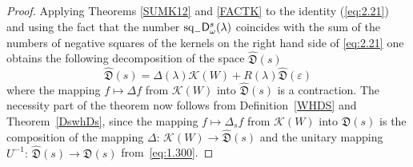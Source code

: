 \documentclass[12pt,twoside,a4paper]{amsart}
\theoremstyle{definition}
\numberwithin{equation}{section}
\begin{document}
\begin{proof}
Applying Theorems \ref{SUMK12} and \ref{FACTK} to the identity
(\ref{eq:2.21}) and using the fact that the number
$\textup{sq}_-{\mathsf D}^s_\omega(\lambda)$ coincides with the sum
of the numbers of negative squares of the kernels on the right hand
side of \eqref{eq:2.21} one obtains the following decomposition of
the space ${{{\widehat {{\mathfrak D}}} }}(s)$
\begin{equation}\label{eq:2.27}
   {{{\widehat {{\mathfrak D}}} }}(s)=\Delta({\lambda}){{\mathcal K}}(W)+R({\lambda}){{{\widehat {{\mathfrak D}}} }}(\varepsilon)
\end{equation}
where the mapping $f\mapsto \Delta  f$ from ${{\mathcal K}}(W)$ into
${{{\widehat {{\mathfrak D}}} }}(s)$ is a contraction. The necessity part of the theorem now
follows from Definition~\ref{WHDS} and Theorem~\ref{DswhDs}, since
the mapping $f\mapsto \Delta_s  f$ from ${{\mathcal K}}(W)$ into ${{\mathfrak D}}(s)$ is
the composition of the mapping $ \Delta:\,{{\mathcal K}}(W)\to{{{\widehat {{\mathfrak D}}} }}(s)$ and
the unitary mapping $U^{-1}:\,{{{\widehat {{\mathfrak D}}} }}(s)\to{{\mathfrak D}}(s)$
from~\eqref{eq:1.300}.


\end{proof}
\end{document}
